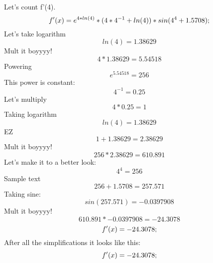 \documentclass[12pt]{article}
\begin{document}
Let's count f'(4). \begin{equation}
\large f'(x)={{{{e}^{{4}*{ln({4})}}}*({{{4}*{{4}^{-1}}}+{ln({4})}})}*{sin({{{4}^{4}}+{1.5708}})}};
\end{equation}
Let's take logarithm
\begin{equation}
{ln({4})}={1.38629}
\end{equation}
Mult it boyyyy!
\begin{equation}
{{4}*{1.38629}}={5.54518}
\end{equation}
Powering
\begin{equation}
{{e}^{5.54518}}={256}
\end{equation}
This power is constant:
\begin{equation}
{{4}^{-1}}={0.25}
\end{equation}
Let's multiply
\begin{equation}
{{4}*{0.25}}={1}
\end{equation}
Taking logarithm
\begin{equation}
{ln({4})}={1.38629}
\end{equation}
EZ
\begin{equation}
{{1}+{1.38629}}={2.38629}
\end{equation}
Mult it boyyyy!
\begin{equation}
{{256}*{2.38629}}={610.891}
\end{equation}
Let's make it to a better look:
\begin{equation}
{{4}^{4}}={256}
\end{equation}
Sample text
\begin{equation}
{{256}+{1.5708}}={257.571}
\end{equation}
Taking sine:
\begin{equation}
{sin({257.571})}={-0.0397908}
\end{equation}
Mult it boyyyy!
\begin{equation}
{{610.891}*{-0.0397908}}={-24.3078}
\end{equation}
\begin{equation}
\large f'(x)={-24.3078};
\end{equation}
After all the simplifications it looks like this:
\begin{equation}
\large f'(x)={-24.3078};
\end{equation}
\end{document}
